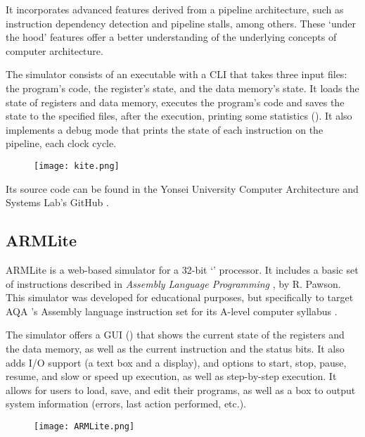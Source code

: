 It incorporates advanced features derived from a \gls{pipeline} architecture, such as \gls{instruction dependency} detection and \gls{pipeline stalls}, among others. These `under the hood' features offer a better understanding of the underlying concepts of computer architecture.

The simulator consists of an executable with a \gls{CLI} that takes three input files: the program's code, the register's state, and the data \gls{memory}'s state. It loads the state of registers and data \gls{memory}, executes the program's code and saves the state to the specified files, after the execution, printing some statistics (). It also implements a \gls{debug} mode that prints the state of each instruction on the \gls{pipeline}, each \gls{clock cycle}.

\begin{figure}[htb]
    {\texttt{[image: kite.png]}}
\end{figure}

Its source code can be found in the Yonsei University Computer Architecture and Systems Lab's GitHub \parencite{kiteGH}.


\subsection*{ARMLite}\label{subsubsec:armlite}
ARMLite \parencite{ARMLite} is a web-based simulator for a 32-bit `' processor. It includes a basic set of instructions described in \textit{Assembly Language Programming} \parencite{PawsonRichard.2020Ass}, by R. Pawson. This simulator was developed for educational purposes, but specifically to target AQA \parencite{AQA}'s Assembly language instruction set for its A-level computer syllabus \parencite{AQAInstructionSet}.

The simulator offers a \gls{GUI} () that shows the current state of the \glspl{register} and the data \gls{memory}, as well as the current instruction and the status bits. It also adds \gls{I/O} support (a text box and a display), and options to start, stop, pause, resume, and slow or speed up execution, as well as step-by-step execution. It allows for users to load, save, and edit their programs, as well as a box to output system information (errors, last action performed, etc.).

\begin{figure}[htb]
    {\texttt{[image: ARMLite.png]}}
\end{figure}

